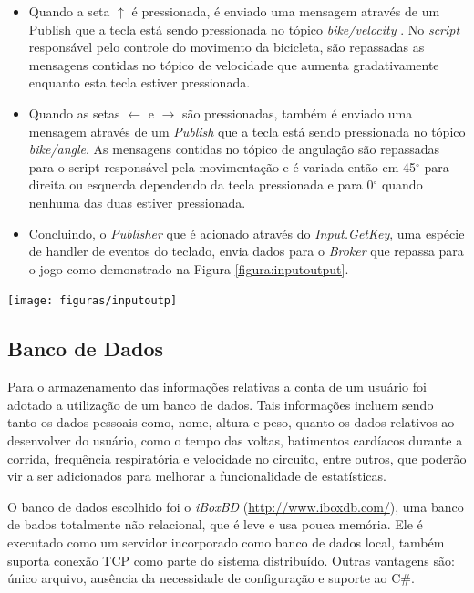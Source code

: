 \begin{itemize}
\item Quando a seta ${\uparrow}$ é pressionada, é enviado uma mensagem através de um Publish que a tecla está sendo pressionada no tópico \textit{bike/velocity} . No \textit{script} responsável pelo controle do movimento da bicicleta, são repassadas as mensagens contidas no tópico de velocidade que aumenta gradativamente enquanto esta tecla estiver pressionada.
\item Quando as setas ${\leftarrow}$ e ${\rightarrow}$ são pressionadas, também é enviado uma mensagem através de um \textit{Publish} que a tecla está sendo pressionada no tópico \textit{bike/angle}. As mensagens contidas no tópico de angulação são repassadas para o script responsável pela movimentação e é variada então em 45$^{\circ}$  para direita ou esquerda dependendo da tecla pressionada e para 0$^{\circ}$  quando nenhuma das duas estiver pressionada.
\item Concluindo, o \textit{Publisher} que é acionado através do \textit{Input.GetKey}, uma espécie de handler de eventos do teclado,  envia dados para o \textit{Broker} que repassa para o jogo como demonstrado na Figura \ref{figura:inputoutput}.
\end{itemize}

\begin{center}
	\texttt{[image: figuras/inputoutp]}
	\label{figura:inputoutput}
\end{center}

\subsection{Banco de Dados}
Para o armazenamento das informações relativas a conta de um usuário foi adotado a utilização de um banco de dados. Tais informações incluem sendo tanto os dados pessoais como, nome, altura e peso, quanto os dados relativos ao desenvolver do usuário, como o tempo das voltas, batimentos cardíacos durante a corrida, frequência respiratória e velocidade no circuito, entre outros, que poderão vir a ser adicionados para melhorar a funcionalidade de estatísticas.

O banco de dados escolhido foi o \textit{iBoxBD} (\url{http://www.iboxdb.com/}), uma banco de bados totalmente não relacional, que é leve e usa pouca memória. Ele é executado como um servidor incorporado como banco de dados local, também suporta conexão TCP como parte do sistema distribuído. Outras vantagens são: único arquivo, ausência da necessidade de configuração e suporte ao C\#.

